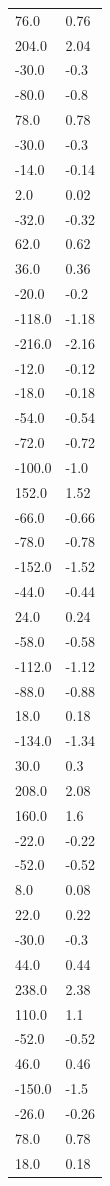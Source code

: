 \begin{longtable}{ll}
76.0 & 0.76 \\
204.0 & 2.04 \\
-30.0 & -0.3 \\
-80.0 & -0.8 \\
78.0 & 0.78 \\
-30.0 & -0.3 \\
-14.0 & -0.14 \\
2.0 & 0.02 \\
-32.0 & -0.32 \\
62.0 & 0.62 \\
36.0 & 0.36 \\
-20.0 & -0.2 \\
-118.0 & -1.18 \\
-216.0 & -2.16 \\
-12.0 & -0.12 \\
-18.0 & -0.18 \\
-54.0 & -0.54 \\
-72.0 & -0.72 \\
-100.0 & -1.0 \\
152.0 & 1.52 \\
-66.0 & -0.66 \\
-78.0 & -0.78 \\
-152.0 & -1.52 \\
-44.0 & -0.44 \\
24.0 & 0.24 \\
-58.0 & -0.58 \\
-112.0 & -1.12 \\
-88.0 & -0.88 \\
18.0 & 0.18 \\
-134.0 & -1.34 \\
30.0 & 0.3 \\
208.0 & 2.08 \\
160.0 & 1.6 \\
-22.0 & -0.22 \\
-52.0 & -0.52 \\
8.0 & 0.08 \\
22.0 & 0.22 \\
-30.0 & -0.3 \\
44.0 & 0.44 \\
238.0 & 2.38 \\
110.0 & 1.1 \\
-52.0 & -0.52 \\
46.0 & 0.46 \\
-150.0 & -1.5 \\
-26.0 & -0.26 \\
78.0 & 0.78 \\
18.0 & 0.18 \\

\end{longtable}
